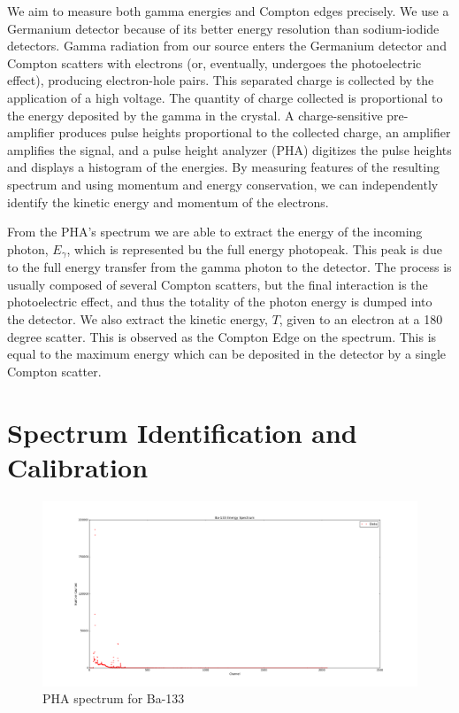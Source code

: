 \documentclass{article}
\begin{document}
We aim to measure both gamma energies and Compton edges precisely. We use a Germanium detector because of its better energy resolution than sodium-iodide detectors. Gamma radiation from our source enters the Germanium detector and Compton scatters with electrons (or, eventually, undergoes the photoelectric effect), producing electron-hole pairs. This separated charge is collected by the application of a high voltage. The quantity of charge collected is proportional to the energy deposited by the gamma in the crystal. A charge-sensitive pre-amplifier produces pulse heights proportional to the collected charge, an amplifier amplifies the signal, and a pulse height analyzer (PHA) digitizes the pulse heights and displays a histogram of the energies. By measuring features of the resulting spectrum and using momentum and energy conservation, we can independently identify the kinetic energy and momentum of the electrons.

\hspace{0.25cm}

From the PHA's spectrum we are able to extract the energy of the incoming photon, $E_\gamma$, which is represented bu the full energy photopeak. This peak is due to the full energy transfer from the gamma photon to the detector. The process is usually composed of several Compton scatters, but the final interaction is the photoelectric effect, and thus the totality of the photon energy is dumped into the detector.
We also extract the kinetic energy, $T$, given to an electron at a 180 degree scatter. This is observed as the Compton Edge on the spectrum. This is equal to the maximum energy which can be deposited in the detector by a single Compton scatter.

\section{Spectrum Identification and Calibration}

\begin{figure}[!htb]
	\centering
	\includegraphics[width = 20cm]{plots/Ba-133_Spectrum.png}
  	\caption{PHA spectrum for Ba-133} 
 	\label{Ba}
\end{figure}
\end{document}
